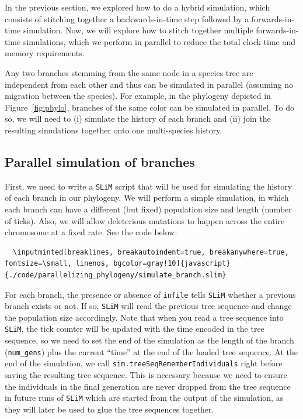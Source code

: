 \documentclass[12pt]{article}
\newcommand{\slim}[0]{\texttt{SLiM}\xspace}
\begin{document}
In the previous section, we explored how to do a hybrid simulation, which consists of stitching together a backwards-in-time step followed by a forwards-in-time simulation.
Now, we will explore how to stitch together multiple forwards-in-time simulations, which we perform in parallel to reduce the total clock time and memory requirements.

Any two branches stemming from the same node in a species tree are independent from each other and
thus can be simulated in parallel (assuming no migration between the species).
For example, in the phylogeny depicted in Figure~\ref{fig:phylo},
branches of the same color can be simulated in parallel.
To do so, we will need to
(i) simulate the history of each branch and
(ii) join the resulting simulations together onto one multi-species history.

\subsection{Parallel simulation of branches}

First, we need to write a \slim script that will be used for simulating the history of each branch in our phylogeny.
We will perform a simple simulation,
in which each branch can have a different (but fixed) population size and length (number of ticks).
Also, we will allow deleterious mutations to happen across the entire chromosome at a fixed rate.
See the code below:

\begin{verbatim}
  \inputminted[breaklines, breakautoindent=true, breakanywhere=true, fontsize=\small, linenos, bgcolor=gray!10]{javascript}{./code/parallelizing_phylogeny/simulate_branch.slim}
\end{verbatim}

For each branch, the presence or absence of \verb|infile| tells \slim whether a previous branch exists or not.
If so, \slim will read the previous tree sequence and change the population size accordingly.
Note that when you read a tree sequence into \slim,
the tick counter will be updated with the time encoded in the tree sequence,
so we need to set the end of the simulation as the length of the branch (\verb|num_gens|)
plus the current “time” at the end of the loaded tree sequence.
At the end of the simulation, we call \verb|sim.treeSeqRememberIndividuals| right before saving the resulting tree sequence.
This is necessary because we need to ensure the individuals in the final generation are never dropped
from the tree sequence in future runs of \slim which are started from the output of the simulation,
as they will later be used to glue the tree sequences together.
\end{document}
